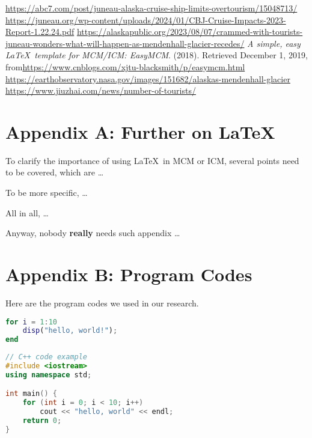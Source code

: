 \documentclass[12pt]{article}  %
\begin{document}

\begin{thebibliography}{99}
 \url{https://abc7.com/post/juneau-alaska-cruise-ship-limits-overtourism/15048713/}
 \url{https://juneau.org/wp-content/uploads/2024/01/CBJ-Cruise-Impacts-2023-Report-1.22.24.pdf}
 \url{https://alaskapublic.org/2023/08/07/crammed-with-tourists-juneau-wonders-what-will-happen-as-mendenhall-glacier-recedes/}
 \emph{A simple, easy \LaTeX\ template for MCM/ICM: EasyMCM}. (2018). Retrieved December 1, 2019, from\url{https://www.cnblogs.com/xjtu-blacksmith/p/easymcm.html}
 \url{https://earthobservatory.nasa.gov/images/151682/alaskas-mendenhall-glacier}
 \url{https://www.jiuzhai.com/news/number-of-tourists/}
\end{thebibliography}


\begin{subappendices}  %

\section{Appendix A: Further on \LaTeX}
To clarify the importance of using \LaTeX\ in MCM or ICM, several points need to be covered, which are \ldots

To be more specific, \ldots

All in all, \ldots

Anyway, nobody \textbf{really} needs such appendix \ldots

\section{Appendix B: Program Codes}
Here are the program codes we used in our research.




\begin{lstlisting}[language=MATLAB, name={test.m}]
% MATLAB code example
for i = 1:10
    disp("hello, world!");
end
\end{lstlisting}

\begin{lstlisting}[language=C++, name={test.cpp}]
// C++ code example
#include <iostream>
using namespace std;

int main() {
    for (int i = 0; i < 10; i++)
        cout << "hello, world" << endl;
    return 0;
}
\end{lstlisting}

\end{subappendices}  %
\end{document}
